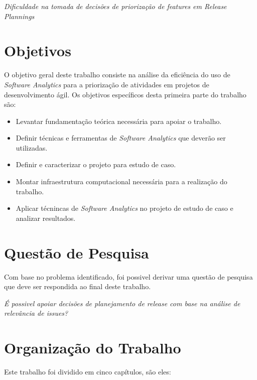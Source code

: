 \begin{center}
  \textit{Dificuldade na tomada de decisões de priorização de features em 
  Release Plannings}
\end{center}

\section{Objetivos}

O objetivo geral deste trabalho consiste na análise da eficiência do uso de
\textit{Software Analytics} para a priorização de atividades em projetos de
desenvolvimento ágil. Os objetivos específicos desta primeira parte do trabalho
são:

\begin{itemize}
    \item Levantar fundamentação teórica necessária para apoiar o trabalho.
    \item Definir técnicas e ferramentas de \textit{Software Analytics} que deverão ser utilizadas.
    \item Definir e caracterizar o projeto para estudo de caso.
    \item Montar infraestrutura computacional necessária para a realização do trabalho.
    \item Aplicar técnincas de \textit{Software Analytics} no projeto de estudo de caso e analizar resultados.
\end{itemize}

\section{Questão de Pesquisa}

Com base no problema identificado, foi possivel derivar uma questão de pesquisa
que deve ser respondida ao final deste trabalho. 

\begin{center}
    \textit{É possivel apoiar decisões de planejamento de release com base na análise de relevância de issues?} 
\end{center}

\section{Organização do Trabalho}
Este trabalho foi dividido em cinco capítulos, são eles:

